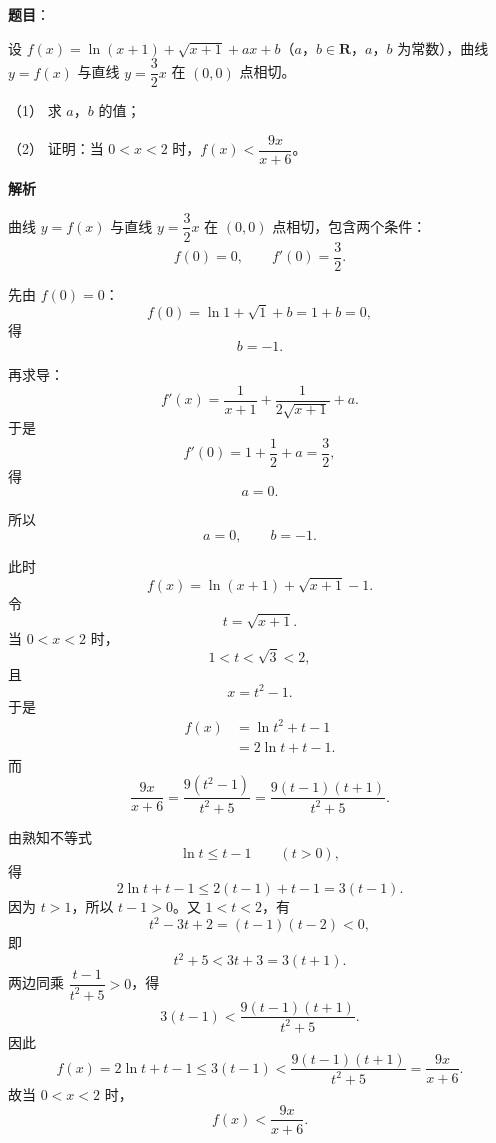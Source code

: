 \begin{answer}


\end{answer}
\begin{answer}

\textbf{题目}：

设 $f(x)=\ln(x+1)+\sqrt{x+1}+ax+b$（$a$，$b\in\mathbf R$，$a$，$b$ 为常数），曲线 $y=f(x)$ 与直线 $y=\dfrac32x$ 在 $(0,0)$ 点相切。

（1） 求 $a$，$b$ 的值；

（2） 证明：当 $0<x<2$ 时，$f(x)<\dfrac{9x}{x+6}$。

\textbf{解析}


曲线 $y=f(x)$ 与直线 $y=\dfrac32x$ 在 $(0,0)$ 点相切，包含两个条件：
\nopagebreak[4]
\[f(0)=0,\qquad f'(0)=\frac32.\]

先由 $f(0)=0$：
\nopagebreak[4]
\[f(0)=\ln1+\sqrt1+b=1+b=0,\]
得
\nopagebreak[4]
\[b=-1.\]

再求导：
\nopagebreak[4]
\[f'(x)=\frac1{x+1}+\frac1{2\sqrt{x+1}}+a.\]
于是
\nopagebreak[4]
\[f'(0)=1+\frac12+a=\frac32,\]
得
\nopagebreak[4]
\[a=0.\]

所以
\nopagebreak[4]
\[a=0,\qquad b=-1.\]


此时
\nopagebreak[4]
\[f(x)=\ln(x+1)+\sqrt{x+1}-1.\]
令
\nopagebreak[4]
\[t=\sqrt{x+1}.\]
当 $0<x<2$ 时，
\nopagebreak[4]
\[1<t<\sqrt3<2,\]
且
\nopagebreak[4]
\[x=t^2-1.\]
于是
\nopagebreak[4]
\[\begin{aligned}
f(x)&=\ln t^2+t-1\\
&=2\ln t+t-1.
\end{aligned}\]
而
\nopagebreak[4]
\[\frac{9x}{x+6}
=\frac{9(t^2-1)}{t^2+5}
=\frac{9(t-1)(t+1)}{t^2+5}.\]

由熟知不等式
\nopagebreak[4]
\[\ln t\leqslant t-1\qquad(t>0),\]
得
\nopagebreak[4]
\[2\ln t+t-1\leqslant2(t-1)+t-1=3(t-1).\]
因为 $t>1$，所以 $t-1>0$。又 $1<t<2$，有
\nopagebreak[4]
\[t^2-3t+2=(t-1)(t-2)<0,\]
即
\nopagebreak[4]
\[t^2+5<3t+3=3(t+1).\]
两边同乘 $\dfrac{t-1}{t^2+5}>0$，得
\nopagebreak[4]
\[3(t-1)<\frac{9(t-1)(t+1)}{t^2+5}.\]
因此
\nopagebreak[4]
\[f(x)=2\ln t+t-1\leqslant3(t-1)
<\frac{9(t-1)(t+1)}{t^2+5}
=\frac{9x}{x+6}.\]
故当 $0<x<2$ 时，
\nopagebreak[4]
\[f(x)<\frac{9x}{x+6}.\]


\end{answer}
